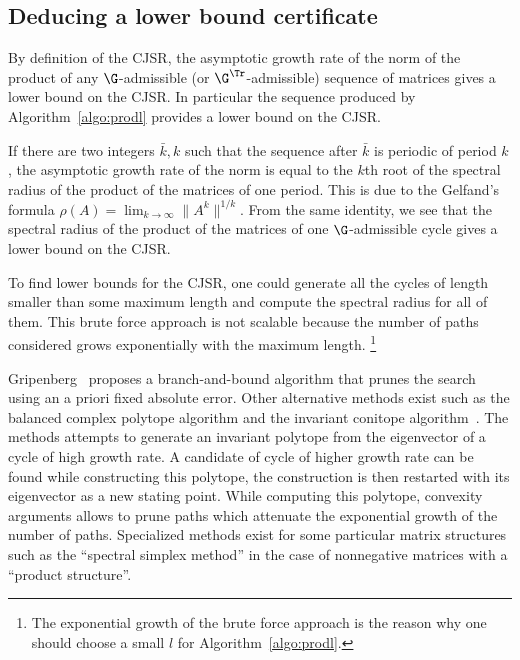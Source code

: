\documentclass[11pt,twoside,a4paper,openright]{uclouvain-thesis}
\begin{document}
\subsection{Deducing a lower bound certificate}
\label{sec:lb}


By definition of the CJSR, the asymptotic growth rate of the norm of the product of any $\G$-admissible (or $\G^\Tr $-admissible) sequence of matrices gives a lower bound on the CJSR.
In particular the sequence produced by Algorithm~\ref{algo:prodl} provides a lower bound on the CJSR.

If there are two integers $\bar{k},k$ such that the sequence after $\bar{k}$ is periodic of period $k$,
the asymptotic growth rate of the norm is equal to the $k$th root of the spectral radius of the product of the matrices of one period.
This is due to the Gelfand's formula $\rho(A) = \lim_{k \to \infty} \|A^k\|^{1/k}$.
From the same identity,
we see that the spectral radius of the product of the matrices of one $\G$-admissible cycle gives a lower bound on the CJSR.



To find lower bounds for the CJSR,
one could generate all the cycles of length smaller than some maximum length
and compute the spectral radius for all of them.
This brute force approach is not scalable because the number of paths considered grows exponentially with the maximum length.%
\footnote{The exponential growth of the brute force approach is the reason why one should choose a small $l$ for Algorithm~\ref{algo:prodl}.}

Gripenberg~\cite{gripenberg1996computing} proposes a branch-and-bound algorithm that prunes the search using an a priori fixed absolute error.
Other alternative methods exist such as
the balanced complex polytope algorithm \cite{guglielmi2008algorithm, guglielmi2013exact}
and the invariant conitope algorithm~\cite{jungers2014lifted}.
The methods attempts to generate an invariant polytope from the eigenvector
of a cycle of high growth rate.
A candidate of cycle of higher growth rate can be found while constructing this polytope,
the construction is then restarted with its eigenvector as a new stating point.
While computing this polytope, convexity arguments allows to prune paths
which attenuate the exponential growth of the number of paths.
Specialized methods exist for some particular matrix structures
such as the ``spectral simplex method'' \cite{protasov2016spectral}
in the case of nonnegative matrices with a ``product structure''.
\end{document}
